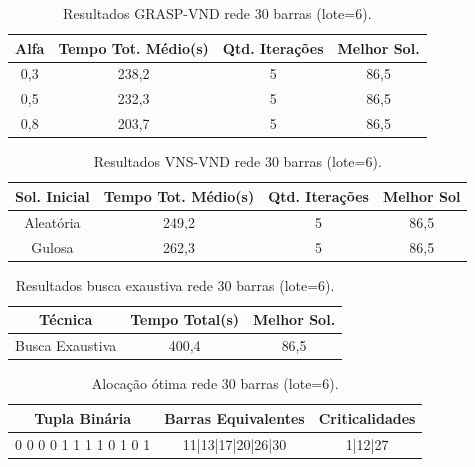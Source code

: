\documentclass[12pt]{article}
\begin{document}
\begin{table}[H]
	\centering
	\caption{Resultados GRASP-VND rede 30 barras (lote=6).}
	\begin{tabular}{|c|c|c|c|}
		\hline
		\textbf{Alfa} & \textbf{Tempo Tot.  Médio(s)} & \textbf{Qtd. Iterações} & \textbf{Melhor Sol.} \\
		\hline
		0,3   & 238,2 & 5     & 86,5 \\
		\hline
		0,5   & 232,3 & 5     & 86,5 \\
		\hline
		0,8   & 203,7 & 5     & 86,5 \\
		\hline
	\end{tabular}%
	\label{tab10}%
\end{table}%

\begin{table}[H]
	\centering
	\caption{Resultados VNS-VND rede 30 barras (lote=6).}
	\begin{tabular}{|c|c|c|c|}
		\hline
		\textbf{Sol. Inicial} & \textbf{Tempo Tot. Médio(s)} & \textbf{Qtd. Iterações} & \textbf{Melhor Sol } \\
		\hline
		Aleatória & 249,2 & 5     & 86,5 \\
		\hline
		Gulosa & 262,3 & 5     & 86,5 \\
		\hline
	\end{tabular}%
	\label{tab11}%
\end{table}%

\begin{table}[H]
	\centering
	\caption{Resultados busca exaustiva rede 30 barras (lote=6).}
	\begin{tabular}{|c|c|c|}
		\hline
		\textbf{Técnica} & \textbf{Tempo Total(s)} & \textbf{Melhor Sol.} \\
		\hline
		Busca Exaustiva & 400,4 & 86,5 \\
		\hline
	\end{tabular}%
	\label{tab12}%
\end{table}%


\begin{table}[H]
	\centering
	\caption{Alocação ótima rede 30 barras (lote=6).}
	\begin{tabular}{|l|c|c|}
		\hline
		\multicolumn{1}{|c|}{\textbf{Tupla Binária}} & \textbf{Barras Equivalentes} & \multicolumn{1}{l|}{\textbf{Criticalidades}} \\
		\hline
		0 0 0 0 1 1 1 1 0 1 0 1 & 11|13|17|20|26|30 & 1|12|27 \\
		\hline
	\end{tabular}%
	\label{tab13}%
\end{table}%
\end{document}
